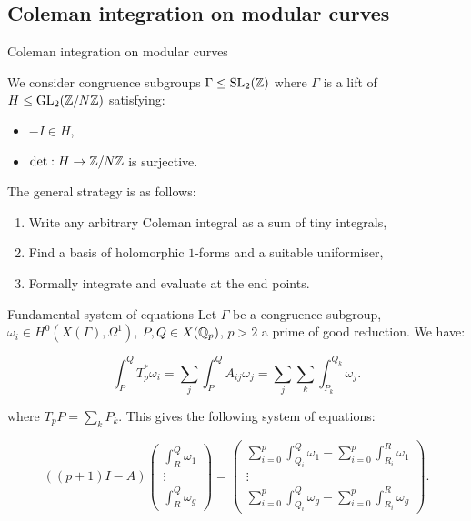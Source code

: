\subsection{Coleman integration on modular curves}

\begin{frame}{Coleman integration on modular curves}

We consider congruence subgroups $\Gamma \leq \operatorname{SL}_2(\mathbb{Z})$ where $\Gamma$ is a lift of $H \leq \operatorname{GL}_2(\mathbb{Z}/N\mathbb{Z})$ satisfying:

\begin{itemize}
\item $-I \in H$,
\item $\det:H \rightarrow \mathbb{Z}/N\mathbb{Z}$ is surjective.
\end{itemize}

The general strategy is as follows:

\begin{enumerate}
\item Write any arbitrary Coleman integral as a sum of tiny integrals,
\item Find a basis of holomorphic $1$-forms and a suitable uniformiser,
\item Formally integrate and evaluate at the end points.
\end{enumerate}
\end{frame}

\begin{frame}{Fundamental system of equations}
Let $\Gamma$ be a congruence subgroup, $\omega_i \in H^0(X(\Gamma), \Omega^1)$, $P,Q \in X(\mathbb{Q}_p)$, $p >2$ a prime of good reduction. We have:

\[
\int_P^Q T_p^* \omega_i = \sum_j \int_P^Q A_{ij} \omega_j = \sum_j \sum_k \int_{P_k}^{Q_k} \omega_j.
\]

where $T_p P = \sum_k P_k.$ This gives the following system of equations: 

\begin{equation*}
   ((p+1)I-A)\begin{pmatrix} \int^Q_R\omega_1 \\\vdots \\ \int^Q_R\omega_g \end{pmatrix} =  \begin{pmatrix} \sum_{i=0}^{p}\int^Q_{Q_i} \omega_1 - \sum_{i=0}^{p}\int^R_{R_i} \omega_1 \\\vdots \\ \sum_{i=0}^{p}\int^Q_{Q_i} \omega_g - \sum_{i=0}^{p}\int^R_{R_i} \omega_g \end{pmatrix}.
\end{equation*}

\end{frame}

